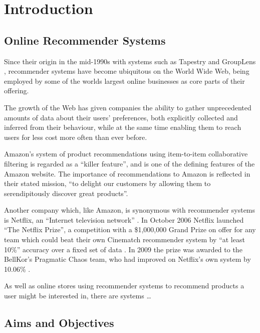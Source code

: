\iffalse 
Chapter 1: Introduction - the topic, the background, why the topic is relevant or of interest to you, what you hoped to achieve, the aims and objectives of the project.  
\fi

\section{Introduction}

\subsection{Online Recommender Systems}

Since their origin in the mid-1990s with systems such as Tapestry \cite{Goldberg92} and GroupLens \cite{Resnick94}, recommender systems have become ubiquitous on the World Wide Web, being employed by some of the worlds largest online businesses as core parts of their offering.

The growth of the Web has given companies the ability to gather unprecedented amounts of data about their users' preferences, both explicitly collected and inferred from their behaviour, while at the same time enabling them to reach users for less cost more often than ever before.

Amazon's system of product recommendations using item-to-item collaborative filtering is regarded as a ``killer feature''\cite{Fortune12}, and is one of the defining features of the Amazon website. The importance of recommendations to Amazon is reflected in their stated mission, ``to delight our customers by allowing them to serendipitously discover great products''\cite{Fortune12}.

Another company which, like Amazon, is synonymous with recommender systems is Netflix, an ``Internet television network'' \cite{NetflixAbout}. In October 2006 Netflix launched ``The Netflix Prize'', a competition with a \$1,000,000 Grand Prize on offer for any team which could beat their own Cinematch recommender system by ``at least 10\%'' accuracy over a fixed set of data \cite{NetflixPrizeRules}. In 2009 the prize was awarded to the BellKor's Pragmatic Chaos team, who had improved on Netflix's own system by 10.06\% \cite{NetflixPrizeCom}. 

As well as online stores using recommender systems to recommend products a user might be interested in, there are systems \ldots

\subsection{Aims and Objectives}

